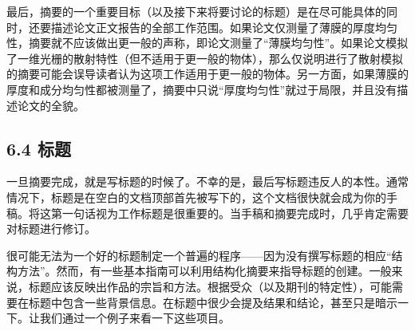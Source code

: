 最后，摘要的一个重要目标（以及接下来将要讨论的标题）是在尽可能具体的同时，还要描述论文正文报告的全部工作范围。如果论文仅测量了薄膜的厚度均匀性，摘要就不应该做出更一般的声称，即论文测量了“薄膜均匀性”。如果论文模拟了一维光栅的散射特性（但不适用于更一般的物体），那么仅说明进行了散射模拟的摘要可能会误导读者认为这项工作适用于更一般的物体。另一方面，如果薄膜的厚度和成分均匀性都被测量了，摘要中只说“厚度均匀性”就过于局限，并且没有描述论文的全貌。

\subsection*{6.4 标题}
一旦摘要完成，就是写标题的时候了。不幸的是，最后写标题违反人的本性。通常情况下，标题是在空白的文档顶部首先被写下的，这个文档很快就会成为你的手稿。将这第一句话视为工作标题是很重要的。当手稿和摘要完成时，几乎肯定需要对标题进行修订。

很可能无法为一个好的标题制定一个普遍的程序——因为没有撰写标题的相应“结构方法”。然而，有一些基本指南可以利用结构化摘要来指导标题的创建。一般来说，标题应该反映出作品的宗旨和方法。根据受众（以及期刊的特定性），可能需要在标题中包含一些背景信息。在标题中很少会提及结果和结论，甚至只是暗示一下。让我们通过一个例子来看一下这些项目。

